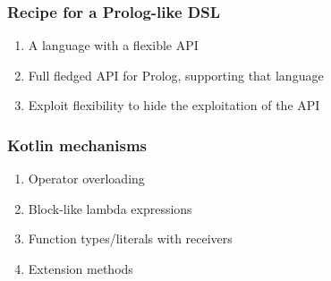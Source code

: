 \documentclass[presentation]{beamer}
\begin{document}
\begin{frame}%
\frametitle{Recipe for a Prolog-like DSL}

    \begin{enumerate}
        \item A language with a flexible API
        \item Full fledged API for Prolog, supporting that language
        \item Exploit flexibility to hide the exploitation of the API
    \end{enumerate}

\end{frame}

\begin{frame}%
    \frametitle{Kotlin mechanisms}

    \begin{enumerate}
        \item Operator overloading

        \item Block-like lambda expressions

        \item Function types/literals with receivers

        \item Extension methods
    \end{enumerate}

\end{frame}
\end{document}
